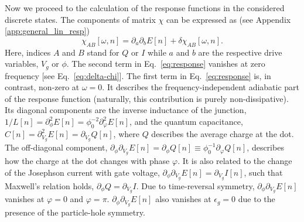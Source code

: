 \documentclass[aps,reprint,longbibliography, prb]{revtex4-2}
\begin{document}
{Now we proceed to the calculation of the response functions in the considered discrete states. The components of matrix $\chi$} can be expressed as (see Appendix \ref{app:general_lin_resp})
\begin{equation}
    \label{eq:response}
    \chi_{AB}[\omega,n] = \partial_{a}\partial_b E[n] + \delta\chi_{AB}[\omega, n].
\end{equation}
Here, indices $A$ and $B$ stand for $Q$ or $I$ while $a$ and $b$ are the respective drive variables, $V_g$ or $\phi$. The second term in Eq.~\eqref{eq:response} vanishes at zero frequency [see Eq.~\eqref{eq:delta-chi}]. The first term in Eq.~\eqref{eq:response} is, in contrast, non-zero at $\omega = 0$. It describes the frequency-independent adiabatic part of the response function (naturally, this contribution is purely non-dissipative). Its diagonal components are the inverse inductance of the junction, $1/L[n] = \partial^2_{\phi} E[n]=\phi_0^{-2}\partial^2_{\varphi} E[n]$, and the quantum capacitance, $C[n] = \partial^2_{V_g} E[n] = \partial_{V_g} Q[n]$, where $Q$ describes the average charge at the dot. The off-diagonal component, $\partial_{\phi}\partial_{V_g} E[n] = \partial_\phi Q[n] \equiv \phi_0^{-1}\partial_\varphi Q[n]$, describes how the charge at the dot changes with phase $\varphi$. It is also related to the change of the Josephson current with gate voltage, $\partial_{\phi}\partial_{V_g} E[n] = \partial_{V_g} I[n]$, such that Maxwell's relation holds, $\partial_\phi Q = \partial_{V_g} I$. Due to time-reversal symmetry, $\partial_{\phi}\partial_{V_g} E[n]$ vanishes at $\varphi = 0$ and $\varphi=\pi$. $\partial_{\phi}\partial_{V_g} E[n]$ also vanishes at $\epsilon_g=0$ due to the presence of the particle-hole symmetry.
\end{document}
